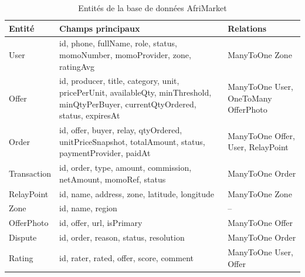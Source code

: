 \documentclass[12pt, a4paper, oneside]{report}
\begin{document}
\begin{table}[H]
  \centering
  \caption{Entités de la base de données AfriMarket}
  \label{tab:entities}
  \begin{tabularx}{\textwidth}{|l|X|l|}
    \hline
    \textbf{Entité} & \textbf{Champs principaux} & \textbf{Relations} \\
    \hline
    User & id, phone, fullName, role, status, momoNumber, momoProvider, zone, ratingAvg & ManyToOne Zone \\
    \hline
    Offer & id, producer, title, category, unit, pricePerUnit, availableQty, minThreshold, minQtyPerBuyer, currentQtyOrdered, status, expiresAt & ManyToOne User, OneToMany OfferPhoto \\
    \hline
    Order & id, offer, buyer, relay, qtyOrdered, unitPriceSnapshot, totalAmount, status, paymentProvider, paidAt & ManyToOne Offer, User, RelayPoint \\
    \hline
    Transaction & id, order, type, amount, commission, netAmount, momoRef, status & ManyToOne Order \\
    \hline
    RelayPoint & id, name, address, zone, latitude, longitude & ManyToOne Zone \\
    \hline
    Zone & id, name, region & -- \\
    \hline
    OfferPhoto & id, offer, url, isPrimary & ManyToOne Offer \\
    \hline
    Dispute & id, order, reason, status, resolution & ManyToOne Order \\
    \hline
    Rating & id, rater, rated, offer, score, comment & ManyToOne User, Offer \\
    \hline
  \end{tabularx}
\end{table}

\printbibliography[heading=bibintoc, title={Références bibliographiques}]
\end{document}
